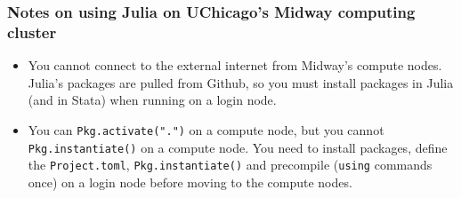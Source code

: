 \subsubsection{Notes on using Julia on UChicago's Midway computing cluster}
\begin{itemize}
\item
You cannot connect to the external internet from Midway's compute nodes. 
Julia's packages are pulled from Github, so you must install packages in Julia (and in Stata) when running on a login node.
\item
You can \texttt{Pkg.activate(".")} on a compute node, but you cannot \texttt{Pkg.instantiate()} on a compute node.
You need to install packages, define the \texttt{Project.toml}, \texttt{Pkg.instantiate()} and precompile (\texttt{using} commands once) on a login node before moving to the compute nodes.  
\end{itemize}

